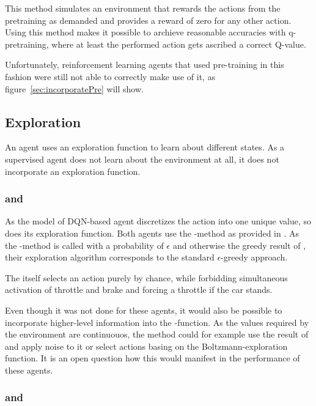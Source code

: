 This method simulates an environment that rewards the actions from the pretraining as demanded and provides a reward of zero for any other action. Using this method makes it possible to archieve reasonable accuracies with q-pretraining, where at least the performed action gets ascribed a correct Q-value. 

Unfortunately, reinforcement learning agents that used pre-training in this fashion were still not able to correctly make use of it, as figure~\ref{sec:incorporatePre} will show.

\subsection{Exploration}

An agent uses an exploration function to learn about different states. As a supervised agent does not learn about the environment at all, it does not incorporate an exploration function.

\subsubsection{ and }

As the model of DQN-based agent discretizes the action into one unique value, so does its exploration function. Both agents use the -method as provided in . As the -method is called with a probability of $\epsilon$ and otherwise the greedy result of , their exploration algorithm corresponds to the standard $\epsilon$-greedy approach.

The  itself selects an action purely by chance, while forbidding simultaneous activation of throttle and brake and forcing a throttle if the car stands.

Even though it was not done for these agents, it would also be possible to incorporate higher-level information into the -function. As the values required by the environment are continuouos, the method could for example use the result of  and apply noise to it or select actions basing on the Boltzmann-exploration function. It is an open question how this would manifest in the performance of these agents.

\subsubsection{ and }

